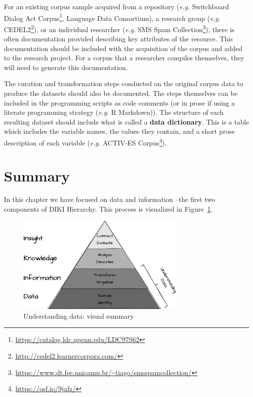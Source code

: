 \documentclass[
  letterpaper,
]{latex/krantz}
\DeclareRobustCommand{\href}[2]{#2\footnote{\url{#1}}}
\begin{document}
For an existing corpus sample acquired from a repository (\emph{e.g.}
\href{https://catalog.ldc.upenn.edu/LDC97S62}{Switchboard Dialog Act
Corpus}, Language Data Consortium), a research group (\emph{e.g.}
\href{http://cedel2.learnercorpora.com/}{CEDEL2}), or an individual
researcher (\emph{e.g.}
\href{https://www.dt.fee.unicamp.br/~tiago/smsspamcollection/}{SMS Spam
Collection}), there is often documentation provided describing key
attributes of the resource. This documentation should be included with
the acquisition of the corpus and added to the research project. For a
corpus that a researcher compiles themselves, they will need to generate
this documentation.

The curation and transformation steps conducted on the original corpus
data to produce the datasets should also be documented. The steps
themselves can be included in the programming scripts as code comments
(or in prose if using a literate programming strategy (\emph{e.g.} R
Markdown)). The structure of each resulting dataset should include what
is called a \textbf{data dictionary}. This is a table which includes the
variable names, the values they contain, and a short prose description
of each variable (\emph{e.g.} \href{https://osf.io/9jafz/}{ACTIV-ES
Corpus}).

\hypertarget{summary-2}{%
\section*{Summary}\label{summary-2}}


In this chapter we have focused on data and information --the first two
components of DIKI Hierarchy. This process is visualized in
Figure~\ref{fig-understanding-data-vis-sum}.

\begin{figure}[h]

{\centering \includegraphics[width=0.75\textwidth,height=\textheight]{figures/understanding-data/ud-diki.drawio.png}

}

\caption{\label{fig-understanding-data-vis-sum}Understanding data:
visual summary}

\end{figure}
\end{document}
